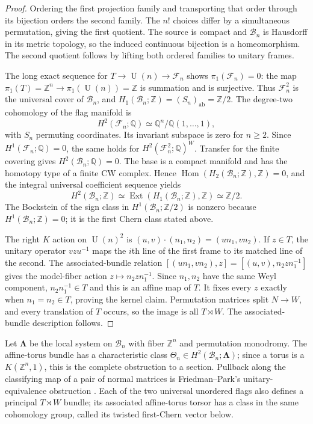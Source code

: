 \documentclass[11pt]{amsart}
\newcommand{\U}{\operatorname{U}}
\newcommand{\Z}{\mathbb Z}
\theoremstyle{plain}
\theoremstyle{definition}
\theoremstyle{remark}
\begin{document}
\begin{proof}
Ordering the first projection family and transporting that order
through its bijection orders the second family. The $n!$ choices differ
by a simultaneous permutation, giving the first quotient. The source
is compact and $\mathcal B_n$ is Hausdorff in its metric topology, so
the induced continuous bijection is a homeomorphism. The second
quotient follows by lifting both ordered families to unitary frames.

The long exact sequence for $T\to\U(n)\to\mathcal F_n$ shows
$\pi_1(\mathcal F_n)=0$: the map
$\pi_1(T)=\Z^n\to\pi_1(\U(n))=\Z$ is summation and is surjective.
Thus $\mathcal F_n^2$ is the universal cover of $\mathcal B_n$,
and $H_1(\mathcal B_n;\Z)=(S_n)_{\mathrm{ab}}=\Z/2$.
The degree-two cohomology of the flag manifold is
\[
 H^2(\mathcal F_n;\mathbb Q)
 \simeq\mathbb Q^n/\mathbb Q(1,\ldots,1),
\]
with $S_n$ permuting coordinates. Its invariant subspace is zero for
$n\geq2$. Since $H^1(\mathcal F_n;\mathbb Q)=0$, the same holds for
$H^2(\mathcal F_n^2;\mathbb Q)^W$. Transfer for the finite covering
gives $H^2(\mathcal B_n;\mathbb Q)=0$. The base is a compact manifold
and has the homotopy type of a finite CW complex. Hence
$\operatorname{Hom}(H_2(\mathcal B_n;\Z),\Z)=0$, and the integral
universal coefficient sequence yields
\[
 H^2(\mathcal B_n;\Z)
 \simeq\operatorname{Ext}(H_1(\mathcal B_n;\Z),\Z)
 \simeq\Z/2.
\]
The Bockstein of the sign class in $H^1(\mathcal B_n;\Z/2)$ is nonzero
because $H^1(\mathcal B_n;\Z)=0$; it is the first Chern class stated
above.

The right $K$ action on $\U(n)^2$ is
$(u,v)\cdot(n_1,n_2)=(un_1,vn_2)$. If $z\in T$, the unitary operator
$vzu^{-1}$ maps the $i$th line of the first frame to its matched line
of the second. The associated-bundle relation
$[(un_1,vn_2),z]=[(u,v),n_2zn_1^{-1}]$ gives the model-fiber action
$z\mapsto n_2zn_1^{-1}$. Since $n_1,n_2$ have the same
Weyl component, $n_2n_1^{-1}\in T$ and this is an affine map of $T$.
It fixes every $z$ exactly when $n_1=n_2\in T$, proving the kernel
claim. Permutation matrices split $N\to W$, and every translation of
$T$ occurs, so the image is all $T\rtimes W$. The associated-bundle
description follows.
\end{proof}

Let $\boldsymbol\Lambda$ be the local system on $\mathcal B_n$ with
fiber $\Z^n$ and permutation monodromy. The affine-torus bundle has a
characteristic class
$\Theta_n\in H^2(\mathcal B_n;\boldsymbol\Lambda)$;
since a torus is a $K(\Z^n,1)$, this is the complete obstruction to a
section. Pullback along the classifying map of a pair of normal
matrices is Friedman--Park's unitary-equivalence obstruction
\cite[Theorem~3.2]{FriedmanPark2016}.
Each of the two universal unordered flags also defines a principal
$T\rtimes W$ bundle; its associated affine-torus torsor has a class in
the same cohomology group, called its twisted first-Chern vector below.
\end{document}
